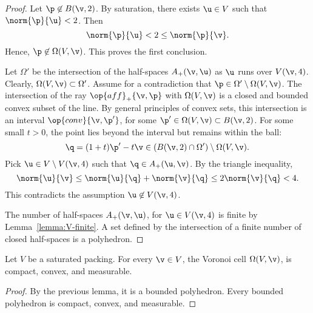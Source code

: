 \begin{proof} Let $\p\not\in B(\v,2)$.  
By saturation, there exists $\u\in V$ such that $\norm{\p}{\u}<2$.
Then 
\begin{displaymath}
\norm{\p}{\u} < 2 \le \norm{\p}{\v}.
\end{displaymath}
Hence, $\p\not\in\Omega(V,\v)$.  This proves the first conclusion.


Let $\Omega'$ be the intersection of the half-spaces $A_+(\v,\u)$ as $\u$ runs
over $V(\v,4)$.  Clearly, $\Omega(V,\v)\subset \Omega'$.  Assume for a contradiction
that $\p\in \Omega'\setminus\Omega(V,\v)$.  The intersection of the ray $\op{aff}_+\{\v,\p\}$
with $\Omega(V,\v)$ is a closed and bounded  convex subset of the line.  By general
principles of convex sets, this intersection is an interval $\op{conv}\{\v,\p'\}$, for some
$\p'\in\Omega(V,\v)\subset B(\v,2)$.   For some small $t>0$,  the point lies beyond
the interval but remains within the ball:
\begin{displaymath}
\q = (1+t)\p' -t \v\in (B(\v,2)\cap \Omega')\setminus \Omega(V,\v).
\end{displaymath}
Pick $\u\in V\setminus V(\v,4)$ such that $\q\in A_+(\u,\v)$.  By the triangle inequality,
\begin{displaymath}
\norm{\u}{\v} \le \norm{\u}{\q} + \norm{\v}{\q} \le 2\norm{\v}{\q} < 4.
\end{displaymath}
This contradicts the assumption $\u\not\in V(\v,4)$.

The number of half-spaces $A_+(\v,\u)$, for $\u\in V(\v,4)$ is finite by
Lemma~\ref{lemma:V-finite}.  A set defined by the intersection of a finite number
of closed half-spaces is a polyhedron.
\end{proof}

\begin{lemma}
Let $ V$ be a saturated packing.  For every $\v\in  V$, 
the Voronoi cell $\Omega( V,\v)$,  is
compact, convex, and measurable.
\end{lemma}

\begin{proof}  By the previous lemma, it is a bounded polyhedron.  Every bounded
polyhedron is compact, convex, and measurable.
\end{proof}




